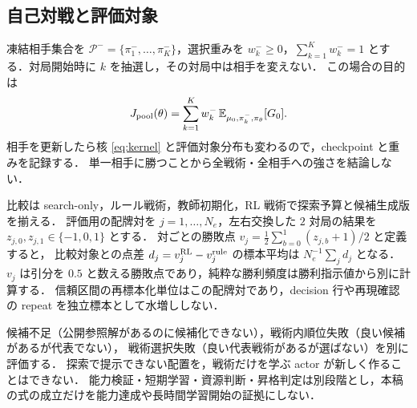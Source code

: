 \subsection{自己対戦と評価対象}
凍結相手集合を $\mathcal P^-=\{\pi_1^-,\ldots,\pi_K^-\}$，選択重みを
$w_k^-\ge0$，$\sum_{k=1}^K w_k^-=1$ とする．対局開始時に $k$ を抽選し，その対局中は相手を変えない．
この場合の目的は
\begin{equation}\label{eq:opponent-mixture}
 J_{\rm pool}(\theta)=\sum_{k=1}^K w_k^-\,
      \mathbb E_{\mu_0,\pi_k^-,\pi_\theta}[G_0].
\end{equation}
相手を更新したら核 \eqref{eq:kernel} と評価対象分布も変わるので，checkpoint と重みを記録する．
単一相手に勝つことから全戦術・全相手への強さを結論しない．

比較は search-only，ルール戦術，教師初期化，RL 戦術で探索予算と候補生成版を揃える．
評価用の配牌対を $j=1,\ldots,N_e$，左右交換した $2$ 対局の結果を $z_{j,0},z_{j,1}\in\{-1,0,1\}$ とする．
対ごとの勝敗点 $v_j=\tfrac12\sum_{b=0}^1(z_{j,b}+1)/2$ と定義すると，
比較対象との点差 $d_j=v_j^{\rm RL}-v_j^{\rm rule}$ の標本平均は $N_e^{-1}\sum_jd_j$ となる．
$v_j$ は引分を $0.5$ と数える勝敗点であり，純粋な勝利頻度は勝利指示値から別に計算する．
信頼区間の再標本化単位はこの配牌対であり，decision 行や再現確認の repeat を独立標本として水増ししない．

候補不足（公開参照解があるのに候補化できない），戦術内順位失敗（良い候補があるが代表でない），
戦術選択失敗（良い代表戦術があるが選ばない）を別に評価する．
探索で提示できない配置を，戦術だけを学ぶ actor が新しく作ることはできない．
能力検証・短期学習・資源判断・昇格判定は別段階とし，本稿の式の成立だけを能力達成や長時間学習開始の証拠にしない．
